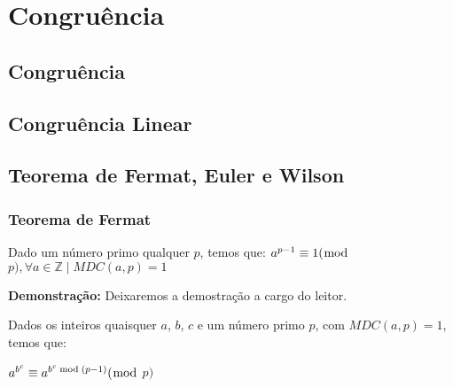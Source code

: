 
\chapter{Congruência} %

\label{Chapter2} %


\section{Congruência}




\section{Congruência Linear}




\section{Teorema de Fermat, Euler e Wilson}

\subsection{Teorema de Fermat}

\begin{theorem}\label{teorema_fermat}
Dado um número primo qualquer $p$, temos que: 
$a^{p-1} \equiv 1 (\bmod$ $p), \forall a \in \mathbb{Z} \mid MDC(a, p) = 1$
\end{theorem}

\textbf{Demonstração:}
Deixaremos a demostração a cargo do leitor.


\begin{theorem}\label{teorema_fermat_expansao}
Dados os inteiros quaisquer $a$, $b$, $c$ e um número primo $p$, com $MDC(a, p) = 1$, temos que:

$a^{b^c} \equiv a^{b^c \bmod (p-1)} (\bmod$ $p)$

\end{theorem}

